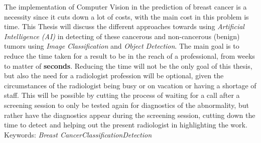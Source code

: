 \documentclass[12pt]{extarticle}
\begin{document}
	The implementation of Computer Vision in the prediction of breast cancer is a necessity since it cuts down a lot of costs, with the main cost in this problem is time. This Thesis will discuss the different approaches towards using \emph{Artificial Intelligence (AI)} in detecting of these cancerous and non-cancerous (benign) tumors using \emph{Image Classification} and \emph{Object Detection}. The main goal is to reduce the time taken for a result to be in the reach of a professional, from weeks to matter of \textbf{seconds}. Reducing the time will not be the only goal of this thesis, but also the need for a radiologist profession will be optional, given the circumstances of the radiologist being busy or on vacation or having a shortage of staff. This will be possible by cutting the process of waiting for a call after a screening session to only be tested again for diagnostics of the abnormality, but rather have the diagnostics appear during the screening session, cutting down the time to detect and helping out the present radiologist in highlighting the work.\\[10mm]
	Keywords: \emph{Breast Cancer\quad Classification\quad Detection}
	\newpage
	\tableofcontents
	\newpage
	\listoffigures
	\lstlistoflistings
	\listoftables
	
\end{document}
